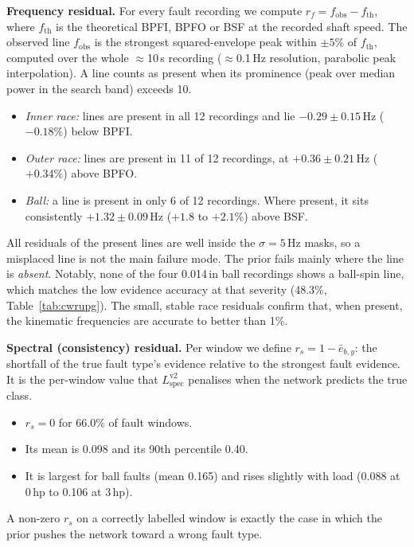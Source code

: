 \documentclass[conference]{IEEEtran}
\newcommand{\Lspec}{L_{\mathrm{spec}}}
\begin{document}
\textbf{Frequency residual.} For every fault recording we compute
$r_f=f_{\mathrm{obs}}-f_{\mathrm{th}}$, where $f_{\mathrm{th}}$ is the
theoretical BPFI, BPFO or BSF at the recorded shaft speed. The observed line
$f_{\mathrm{obs}}$ is the strongest squared-envelope peak within $\pm5\%$ of
$f_{\mathrm{th}}$, computed over the whole $\approx$10\,s recording
($\approx$0.1\,Hz resolution, parabolic peak interpolation). A line counts as
present when its prominence (peak over median power in the search band)
exceeds 10.
\begin{itemize}
\item \emph{Inner race:} lines are present in all 12 recordings and lie
$-0.29\pm0.15$\,Hz ($-0.18\%$) below BPFI.
\item \emph{Outer race:} lines are present in 11 of 12 recordings, at
$+0.36\pm0.21$\,Hz ($+0.34\%$) above BPFO.
\item \emph{Ball:} a line is present in only 6 of 12 recordings. Where
present, it sits consistently $+1.32\pm0.09$\,Hz ($+1.8$ to $+2.1\%$) above
BSF.
\end{itemize}
All residuals of the present lines are well inside the $\sigma=5$\,Hz masks,
so a misplaced line is not the main failure mode. The prior fails mainly where
the line is \emph{absent}. Notably, none of the four 0.014\,in ball recordings
shows a ball-spin line, which matches the low evidence accuracy at that
severity (48.3\%, Table~\ref{tab:cwrupg}). The small, stable race residuals
confirm that, when present, the kinematic frequencies are accurate to better
than 1\%.

\textbf{Spectral (consistency) residual.} Per window we define
$r_s=1-\bar e_{b,y}$: the shortfall of the true fault type's evidence relative
to the strongest fault evidence. It is the per-window value that
$\Lspec^{\mathrm{v2}}$ penalises when the network predicts the true class.
\begin{itemize}
\item $r_s=0$ for 66.0\% of fault windows.
\item Its mean is 0.098 and its 90th percentile 0.40.
\item It is largest for ball faults (mean 0.165) and rises slightly with load
(0.088 at 0\,hp to 0.106 at 3\,hp).
\end{itemize}
A non-zero $r_s$ on a correctly labelled window is exactly the case in which
the prior pushes the network toward a wrong fault type.
\end{document}
